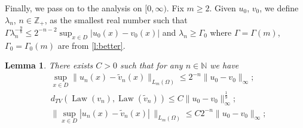 \documentclass[12pt]{article}
\newtheorem{lemma}[theorem]{Lemma}
\theoremstyle{definition}
\DeclareMathOperator{\1}{\mathbbm{1}}%
\DeclareMathOperator{\law}{Law}%
\renewcommand{\ge}{\geqslant}
\renewcommand{\le}{\leqslant}
\newcommand{\dis}{\infty}
\newcommand{\wt}{\widetilde}
\newcommand{\N}{\mathbb{N}}
\newcommand{\Z}{\mathbb{Z}}
\begin{document}
Finally, we pass on to the analysis on $[0,\infty)$. Fix $m\ge2$. Given $u_0$, $v_0$, we define $\lambda_n$, $n\in\Z_+$, as the smallest real number such that
$
\Gamma \lambda_n^{-\frac98}\le 2^{-n-2}\sup_{x\in D}|u_0(x)-v_0(x)|
$ and  $\lambda_n\ge\Gamma_0$ where $\Gamma=\Gamma(m)$, $\Gamma_0=\Gamma_0(m)$ are from \cref{l:better}.
\begin{lemma}\label{L:27}
There exists $C>0$ such that for any $n\in\N$ we have 
\begin{align}\label{firstres}
&\sup_{x\in D}\|u_{n}(x)-\wt v_{n}(x)\|_{L_m(\Omega)}\le 2^{-n}\|u_0-v_0\|_{\dis};\\
&d_{TV}(\law(v_n),\law(\wt v_n))\le C \|u_0-v_0\|_{\dis}^{\frac19};\label{secondres}\\
&\|\sup_{x\in D} |u_{n}(x)-\wt v_{n}(x)|\,\|_{L_m(\Omega)}\le C 2^{-n}\|u_0-v_0\|_{\dis};\label{thirdres}
\end{align}
\end{lemma}
\end{document}
